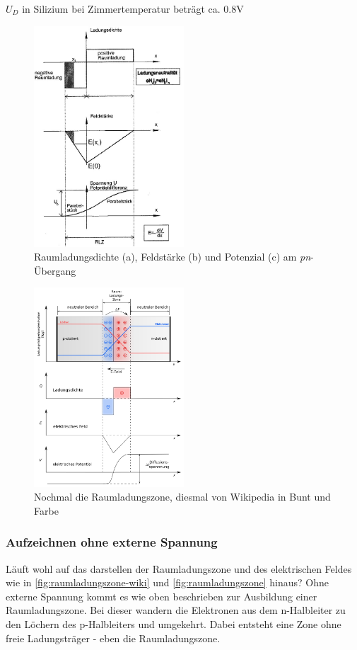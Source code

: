 	$U_D$ in Silizium bei Zimmertemperatur beträgt ca. 0.8V 
    \begin{figure}[H]
        \centering
        \includegraphics[width=0.5\textwidth]{fig/raumladungszone}
        \caption{Raumladungsdichte (a), Feldstärke (b) und Potenzial (c) am \textit{pn}-Übergang}
        \label{fig:raumladungszone}
    \end{figure}
    
       \begin{figure}[H]
        \centering
        \includegraphics[width=0.5\textwidth]{fig/raumladungszone-wiki}
        \caption{Nochmal die Raumladungszone, diesmal von Wikipedia in Bunt und Farbe}
        \label{fig:raumladungszone-wiki}
    \end{figure}


	\subsubsection{Aufzeichnen ohne externe Spannung}
	Läuft wohl auf das darstellen der Raumladungszone und des elektrischen Feldes wie in \autoref{fig:raumladungszone-wiki} und \autoref{fig:raumladungszone} hinaus?
	Ohne externe Spannung kommt es wie oben beschrieben zur Ausbildung einer Raumladungszone. Bei dieser wandern die Elektronen aus dem n-Halbleiter zu den Löchern des p-Halbleiters und umgekehrt. Dabei entsteht eine Zone ohne freie Ladungsträger - eben die Raumladungszone. 
	
